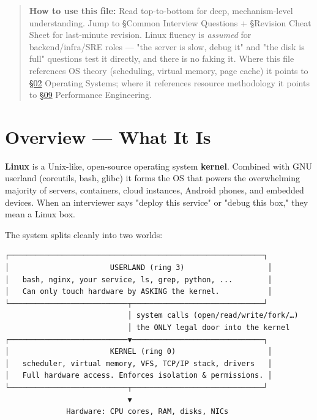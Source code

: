 \documentclass[11pt]{article}
\begin{document}
\makecoverpage

\thispagestyle{empty}
{\hypersetup{hidelinks}\tableofcontents}
\clearpage

\begin{quote}
\textbf{How to use this file:} Read top-to-bottom for deep, mechanism-level understanding. Jump to §Common Interview Questions + §Revision Cheat Sheet for last-minute revision. Linux fluency is \emph{assumed} for backend/infra/SRE roles --- "the server is slow, debug it" and "the disk is full" questions test it directly, and there is no faking it. Where this file references OS theory (scheduling, virtual memory, page cache) it points to \hyperlink{section.02}{\textcolor{acc}{§02}} Operating Systems; where it references resource methodology it points to \hyperlink{section.09}{\textcolor{acc}{§09}} Performance Engineering.
\end{quote}

\section{Overview --- What It Is}\label{overview--what-it-is}

\textbf{Linux} is a Unix-like, open-source operating system \textbf{kernel}. Combined with GNU userland (coreutils, bash, glibc) it forms the OS that powers the overwhelming majority of servers, containers, cloud instances, Android phones, and embedded devices. When an interviewer says "deploy this service" or "debug this box," they mean a Linux box.

The system splits cleanly into two worlds:

\setcodelang{}

\begin{verbatim}
┌──────────────────────────────────────────────────────────┐
│                       USERLAND (ring 3)                   │
│   bash, nginx, your service, ls, grep, python, ...        │
│   Can only touch hardware by ASKING the kernel.           │
└───────────────────────────┬──────────────────────────────┘
                            │ system calls (open/read/write/fork/…)
                            │ the ONLY legal door into the kernel
┌───────────────────────────▼──────────────────────────────┐
│                       KERNEL (ring 0)                     │
│   scheduler, virtual memory, VFS, TCP/IP stack, drivers   │
│   Full hardware access. Enforces isolation & permissions. │
└───────────────────────────┬──────────────────────────────┘
                            ▼
              Hardware: CPU cores, RAM, disks, NICs
\end{verbatim}
\end{document}
